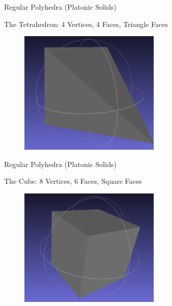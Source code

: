 \documentclass{beamer}
\begin{document}
\begin{frame}{Regular Polyhedra (Platonic Solids)}

The Tetrahedron: 4 Vertices, 4 Faces, Triangle Faces

\begin{figure}[t]
    \includegraphics[width=0.6\textwidth]{PlatonicSolids/Tetrahedron.png}
\end{figure}

\end{frame}



\begin{frame}{Regular Polyhedra (Platonic Solids)}

The Cube: 8 Vertices, 6 Faces, Square Faces

\begin{figure}[t]
    \includegraphics[width=0.6\textwidth]{PlatonicSolids/Cube.png}
\end{figure}

\end{frame}
\end{document}
